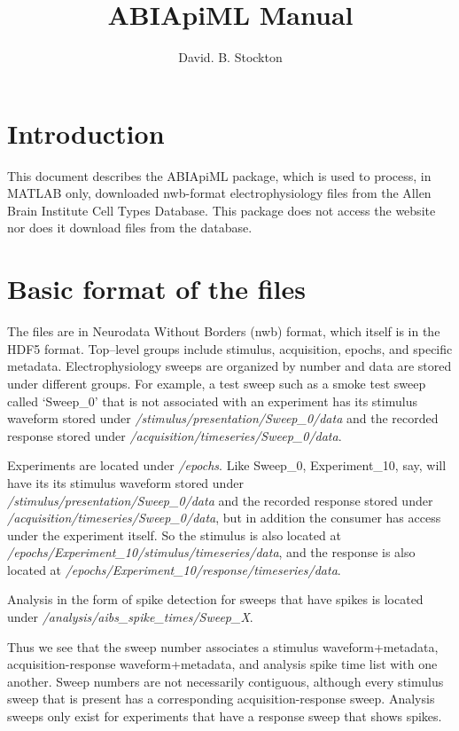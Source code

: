 \documentclass{article}
\title{ABIApiML Manual}
\author{David. B. Stockton}
\begin{document}
\maketitle

\section{Introduction}
This document describes the ABIApiML package, which is used to process, in MATLAB only, downloaded nwb-format electrophysiology files from the Allen Brain Institute Cell Types Database.  This package does not access the website nor does it download files from the database.

\section{Basic format of the files}
\begin{sloppypar}
The files are in Neurodata Without Borders (nwb) format, which itself is in the HDF5 format. Top--level groups include stimulus, acquisition, epochs, and specific metadata. Electrophysiology sweeps are organized by number and data are stored under different groups.  For example, a test sweep such as a smoke test sweep called `Sweep\_0' that is not associated with an experiment has its stimulus waveform stored under \textit{/stimulus/presentation/Sweep\_0/data} and the recorded response stored under \textit{/acquisition/timeseries/Sweep\_0/data}. 
\end{sloppypar}

\begin{sloppypar}
Experiments are located under \textit{/epochs}.  Like Sweep\_0, Experiment\_10, say, will have its its stimulus waveform stored under \textit{/stimulus/presentation/Sweep\_0/data} and the recorded response stored under \textit{/acquisition/timeseries/Sweep\_0/data}, but in addition the consumer has access under the experiment itself.  So the stimulus is also located at \textit{/epochs/Experiment\_10/stimulus/timeseries/data}, and the response is also located at \textit{/epochs/Experiment\_10/response/timeseries/data}.
\end{sloppypar}

\begin{sloppypar}
Analysis in the form of spike detection for sweeps that have spikes is located under \textit{/analysis/aibs\_spike\_times/Sweep\_X}.
\end{sloppypar}

Thus we see that the sweep number associates a stimulus waveform+metadata, acquisition-response waveform+metadata, and analysis spike time list with one another. Sweep numbers are not necessarily contiguous, although every stimulus sweep that is present has a corresponding acquisition-response sweep.  Analysis sweeps only exist for experiments that have a response sweep that shows spikes.  
\end{document}
